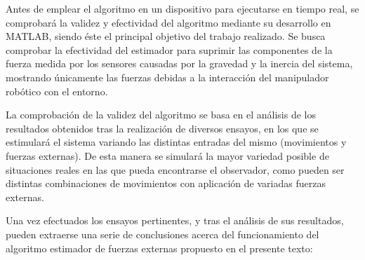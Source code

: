 Antes de emplear el algoritmo en un dispositivo para ejecutarse en tiempo real, se comprobará la validez y efectividad del algoritmo mediante su desarrollo en MATLAB, siendo éste el principal objetivo del trabajo realizado. Se busca comprobar la efectividad del estimador para suprimir las componentes de la fuerza medida por los sensores causadas por la gravedad y la inercia del sistema, mostrando únicamente las fuerzas debidas a la interacción del manipulador robótico con el entorno. \par 

La comprobación de la validez del algoritmo se basa en el análisis de los resultados obtenidos tras la realización de diversos ensayos, en los que se estimulará el sistema variando las distintas entradas del mismo (movimientos y fuerzas externas). De esta manera se simulará la mayor variedad posible de situaciones reales en las que pueda encontrarse el observador, como pueden ser distintas combinaciones de movimientos con aplicación de variadas fuerzas externas. \par 

Una vez efectuados los ensayos pertinentes, y tras el análisis de sus resultados, pueden extraerse una serie de conclusiones acerca del funcionamiento del algoritmo estimador de fuerzas externas propuesto en el presente texto:

